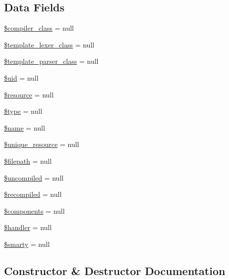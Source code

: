 \subsection*{Data Fields}
\begin{DoxyCompactItemize}
\item 
\hyperlink{class_smarty___template___source_a7696818dcf593c5f9471d7f76ea2e645}{\$compiler\+\_\+class} = null
\item 
\hyperlink{class_smarty___template___source_a134f002da1134c7b756f1d48c9b2ad56}{\$template\+\_\+lexer\+\_\+class} = null
\item 
\hyperlink{class_smarty___template___source_a5861bfb4f75ed665b42ce8eba8ae51f8}{\$template\+\_\+parser\+\_\+class} = null
\item 
\hyperlink{class_smarty___template___source_a109bbd7f4add27541707b191b73ef84a}{\$uid} = null
\item 
\hyperlink{class_smarty___template___source_abd4c7b8b084214b8d2533ba07fce6b83}{\$resource} = null
\item 
\hyperlink{class_smarty___template___source_a9a4a6fba2208984cabb3afacadf33919}{\$type} = null
\item 
\hyperlink{class_smarty___template___source_ab2fc40d43824ea3e1ce5d86dee0d763b}{\$name} = null
\item 
\hyperlink{class_smarty___template___source_a44edb9ab90ad990172ef3a2d9e83225d}{\$unique\+\_\+resource} = null
\item 
\hyperlink{class_smarty___template___source_a3bce02156476bcca5e7573793b12226c}{\$filepath} = null
\item 
\hyperlink{class_smarty___template___source_ab058dde32f958583924531d198c63225}{\$uncompiled} = null
\item 
\hyperlink{class_smarty___template___source_a0974ea7e61b7935a49e4f11000bdda19}{\$recompiled} = null
\item 
\hyperlink{class_smarty___template___source_a2409c247baf67a1d4c6b9a1789cfc088}{\$components} = null
\item 
\hyperlink{class_smarty___template___source_a9285a7f684c72e9bb78fdef1bcbe3fd0}{\$handler} = null
\item 
\hyperlink{class_smarty___template___source_ac3ae29e9ccbb2006fa26fd9eb2c12117}{\$smarty} = null
\end{DoxyCompactItemize}


\subsection{Constructor \& Destructor Documentation}
\hypertarget{class_smarty___template___source_a1b175af6efed8fa7081e2c8cebe4a13d}{}
